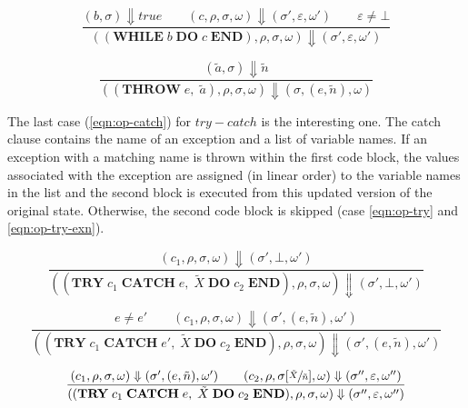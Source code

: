\begin{equation}\label{eqn:op-while-exn}
\frac{(b, \sigma) \Downarrow true \qquad (c, \rho, \sigma, \omega) \Downarrow (\sigma', \varepsilon, \omega') \qquad \varepsilon \neq \bot}{((\textbf{WHILE}\; b\; \textbf{DO}\; c\; \textbf{END}), \rho, \sigma, \omega) \Downarrow (\sigma', \varepsilon, \omega')}
\end{equation}

\begin{equation}\label{eqn:op-throw}
\frac{(\tilde{a}, \sigma) \Downarrow \tilde{n}}{((\textbf{THROW}\; e,\; \tilde{a}), \rho, \sigma, \omega) \Downarrow (\sigma, (e, \tilde{n}), \omega)}
\end{equation}

The last case (\ref{eqn:op-catch}) for $try-catch$ is the interesting one. The catch clause contains the name of an exception and a list of variable names. If an exception with a matching name is thrown within the first code block, the values associated with the exception are assigned (in linear order) to the variable names in the list and the second block is executed from this updated version of the original state. Otherwise, the second code block is skipped (case \ref{eqn:op-try} and \ref{eqn:op-try-exn}).

\begin{equation}\label{eqn:op-try}
\frac{(c_1, \rho, \sigma, \omega) \Downarrow (\sigma', \bot, \omega')}{((\textbf{TRY}\; c_1\; \textbf{CATCH}\; e,\; \tilde{X}\; \textbf{DO}\; c_2\; \textbf{END}), \rho, \sigma, \omega) \Downarrow (\sigma', \bot, \omega')}
\end{equation}

\begin{equation}\label{eqn:op-try-exn}
\frac{e \neq e' \qquad (c_1, \rho, \sigma, \omega) \Downarrow (\sigma', (e, \tilde{n}), \omega')}{((\textbf{TRY}\; c_1\; \textbf{CATCH}\; e',\; \tilde{X}\; \textbf{DO}\; c_2\; \textbf{END}), \rho, \sigma, \omega) \Downarrow (\sigma', (e, \tilde{n}), \omega')}
\end{equation}

\begin{equation}\label{eqn:op-catch}
\frac{(c_1, \rho, \sigma, \omega) \Downarrow (\sigma', (e, \tilde{n}), \omega') \qquad (c_2, \rho, \sigma[\sfrac{\tilde{X}}{\tilde{n}}], \omega) \Downarrow (\sigma'', \varepsilon, \omega'')}{((\textbf{TRY}\; c_1\; \textbf{CATCH}\; e,\; \tilde{X}\; \textbf{DO}\; c_2\; \textbf{END}), \rho, \sigma, \omega) \Downarrow (\sigma'', \varepsilon, \omega'')}
\end{equation}

